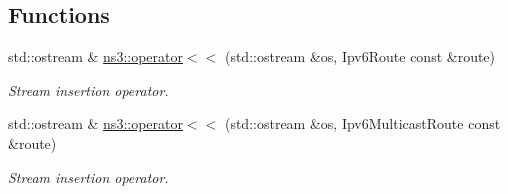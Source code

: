 \subsection*{Functions}
\begin{DoxyCompactItemize}
\item 
std\+::ostream \& \hyperlink{namespacens3_a057108a75ec52fb2255968b42c883a5f}{ns3\+::operator$<$$<$} (std\+::ostream \&os, Ipv6\+Route const \&route)
\begin{DoxyCompactList}\small\item\em Stream insertion operator. \end{DoxyCompactList}\item 
std\+::ostream \& \hyperlink{namespacens3_a348db539135f304849c2cf3401f8f419}{ns3\+::operator$<$$<$} (std\+::ostream \&os, Ipv6\+Multicast\+Route const \&route)
\begin{DoxyCompactList}\small\item\em Stream insertion operator. \end{DoxyCompactList}\end{DoxyCompactItemize}
